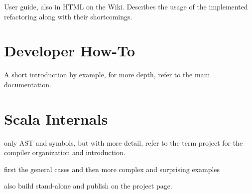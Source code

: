 \documentclass[10pt,a4paper,oneside]{scrreprt}
\begin{document}
User guide, also in HTML on the Wiki. Describes the usage of the implemented refactoring along with their shortcomings.

\chapter{Developer How-To}

A short introduction by example, for more depth, refer to the main documentation.

\chapter{Scala Internals}

only AST and symbols, but with more detail, refer to the term project for the compiler organization and introduction.

first the general cases and then more complex and surprising examples

also build stand-alone and publish on the project page.



\clearpage
\bib
\end{document}
